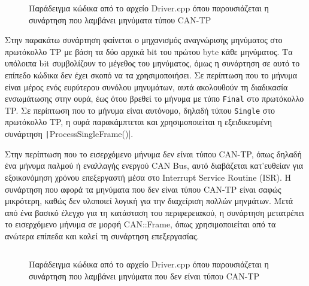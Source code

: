 \documentclass[a4paper,nobib,justified]{tufte-book}
\begin{document}
\begin{figure}
	\inputminted{c++}{code/examples/driver-tp-message-receiver.cpp}
	\label{code:driver-tp-message-receiver}
	\caption[Η συνάρτηση που λαμβάνει μηνύματα τύπου CAN-TP]{Παράδειγμα κώδικα από το αρχείο Driver.cpp όπου παρουσιάζεται η συνάρτηση που λαμβάνει μηνύματα τύπου CAN-TP}
\end{figure}

Στην παρακάτω συνάρτηση φαίνεται ο μηχανισμός αναγνώρισης μηνύματος στο πρωτόκολλο TP με βάση τα δύο αρχικά bit του πρώτου byte κάθε μηνύματος. Τα υπόλοιπα bit συμβολίζουν το μέγεθος του μηνύματος, όμως η συνάρτηση σε αυτό το επίπεδο κώδικα δεν έχει σκοπό να τα χρησιμοποιήσει. Σε περίπτωση που το μήνυμα είναι μέρος ενός ευρύτερου συνόλου μηνυμάτων, αυτά ακολουθούν τη διαδικασία ενσωμάτωσης στην ουρά, έως ότου βρεθεί το μήνυμα με τύπο \texttt{Final} στο πρωτόκολλο TP. Σε περίπτωση που το μήνυμα είναι αυτόνομο, δηλαδή τύπου \texttt{Single} στο πρωτόκολλο TP, η ουρά παρακάμπτεται και χρησιμοποιείται η εξειδικευμένη συνάρτηση \texttt|ProcessSingleFrame()|.

Στην περίπτωση που το εισερχόμενο μήνυμα δεν είναι τύπου CAN-TP, όπως δηλαδή ένα μήνυμα παλμού ή εναλλαγής ενεργού CAN Bus, αυτό διαβάζεται κατ'ευθείαν για εξοικονόμηση χρόνου επεξεργαστή μέσα στο Interrupt Service Routine (ISR). Η συνάρτηση που αφορά τα μηνύματα που δεν είναι τύπου CAN-TP είναι σαφώς μικρότερη, καθώς δεν υλοποιεί λογική για την διαχείριση πολλών μηνμάτων. Μετά από ένα βασικό έλεγχο για τη κατάσταση του περιφερειακού, η συνάρτηση μετατρέπει το εισερχόμενο μήνυμα σε μορφή CAN::Frame, όπως χρησιμοποιείται από τα ανώτερα επίπεδα και καλεί τη συνάρτηση επεξεργασίας.

\begin{figure}
	\inputminted{c++}{code/examples/driver-non-tp-receiver.cpp}
	\label{code:driver-non-tp-receiver}
	\caption[Η συνάρτηση που λαμβάνει μηνύματα που δεν είναι τύπου CAN-TP]{Παράδειγμα κώδικα από το αρχείο Driver.cpp όπου παρουσιάζεται η συνάρτηση που λαμβάνει μηνύματα που δεν είναι τύπου CAN-TP}
\end{figure}
\end{document}
